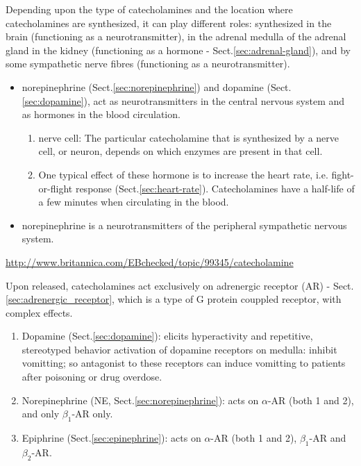 Depending upon the type of catecholamines and the location where catecholamines
are synthesized, it can play different roles: synthesized in the brain
(functioning as a neurotransmitter), in the adrenal medulla of the adrenal gland
in the kidney (functioning as a hormone - Sect.\ref{sec:adrenal-gland}), and by
some sympathetic nerve fibres (functioning as a neurotransmitter).

\begin{itemize}
  
  \item norepinephrine (Sect.\ref{sec:norepinephrine}) and dopamine
  (Sect.\ref{sec:dopamine}), act as neurotransmitters in the central nervous
  system and as hormones in the blood circulation.

  \begin{enumerate}
    \item  nerve cell: The particular catecholamine that is synthesized by a nerve
    cell, or neuron, depends on which enzymes are present in that cell. 
    
    \item One typical effect of these hormone is to increase the heart rate,
    i.e. fight-or-flight response (Sect.\ref{sec:heart-rate}).
    Catecholamines have a half-life of a few minutes when circulating in the blood.
    
  \end{enumerate}  
  
  \item  norepinephrine is a neurotransmitters of the peripheral sympathetic
  nervous system.
\end{itemize}
\url{http://www.britannica.com/EBchecked/topic/99345/catecholamine}

Upon released, catecholamines act exclusively on adrenergic receptor (AR) -
Sect.\ref{sec:adrenergic_receptor}, which is a type of G protein couppled
receptor, with complex effects.
\begin{enumerate}
  
  \item Dopamine (Sect.\ref{sec:dopamine}): elicits hyperactivity and repetitive,
  stereotyped behavior activation of dopamine receptors on medulla: inhibit
  vomitting; so antagonist to these receptors can induce vomitting to patients
  after poisoning or drug overdose.

  

  \item Norepinephrine (NE, Sect.\ref{sec:norepinephrine}): acts on $\alpha$-AR
  (both 1 and 2), and only $\beta_1$-AR only.
  
  \item Epiphrine (Sect.\ref{sec:epinephrine}): acts on $\alpha$-AR (both 1 and
  2), $\beta_1$-AR and $\beta_2$-AR.
\end{enumerate}

